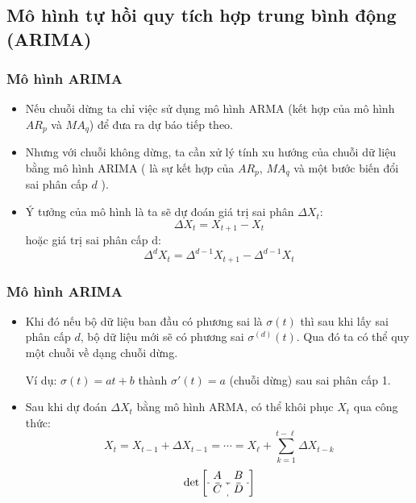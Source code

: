 \subsection{Mô hình tự hồi quy tích hợp trung bình động (ARIMA)}
\begin{frame}
\frametitle{Mô hình ARIMA}
\begin{itemize}
    \item Nếu chuỗi dừng ta chỉ việc sử dụng mô hình ARMA (kết hợp của mô hình $AR_p$ và $MA_q$) để đưa ra dự báo tiếp theo.
\item Nhưng với chuỗi không dừng, ta cần xử lý tính xu hướng của chuỗi dữ liệu bằng mô hình ARIMA ( là sự kết hợp của $AR_p$, $MA_q$ và một bước biến đổi sai phân cấp $d$ ).
\item Ý tưởng của mô hình là ta sẽ dự đoán giá trị sai phân $\Delta X_t$:
\begin{equation}
\Delta X_t = X_{t+1} - X_{t}
\end{equation}
hoặc giá trị sai phân cấp d:
\begin{equation}
\Delta^dX_t = \Delta^{d-1}X_{t+1} - \Delta^{d-1}X_{t} \label{eq:ARIMA}
\end{equation}
\end{itemize}
\end{frame}
\begin{frame}
\frametitle{Mô hình ARIMA}
\begin{itemize}
    \item Khi đó nếu bộ dữ liệu ban đầu có phương sai là $\sigma(t)$ thì sau khi lấy sai phân cấp $d$, bộ dữ liệu mới sẽ có phương sai $\sigma^{(d)}(t)$.
Qua đó ta có thể quy một chuỗi về dạng chuỗi dừng.
\vspace{0.25cm}

    
     Ví dụ: $\sigma(t)=at+b$ thành $\sigma'(t)=a$ (chuỗi dừng) sau sai phân cấp 1.

\item Sau khi dự đoán $\Delta X_t$ bằng mô hình ARMA, có thể khôi phục $X_t$ qua công thức:
\begin{equation}
X_t = X_{t-1} + \Delta X_{t-1} = \cdots = X_\ell + \sum_{k=1}^{t-\ell}\Delta X_{t-k}
\end{equation}
\[
\det 
\left[
\begin{array}{c:c}
    A   & B \\ \hdashline
    C &  D
\end{array}
\right]
\]
\end{itemize}
\end{frame}